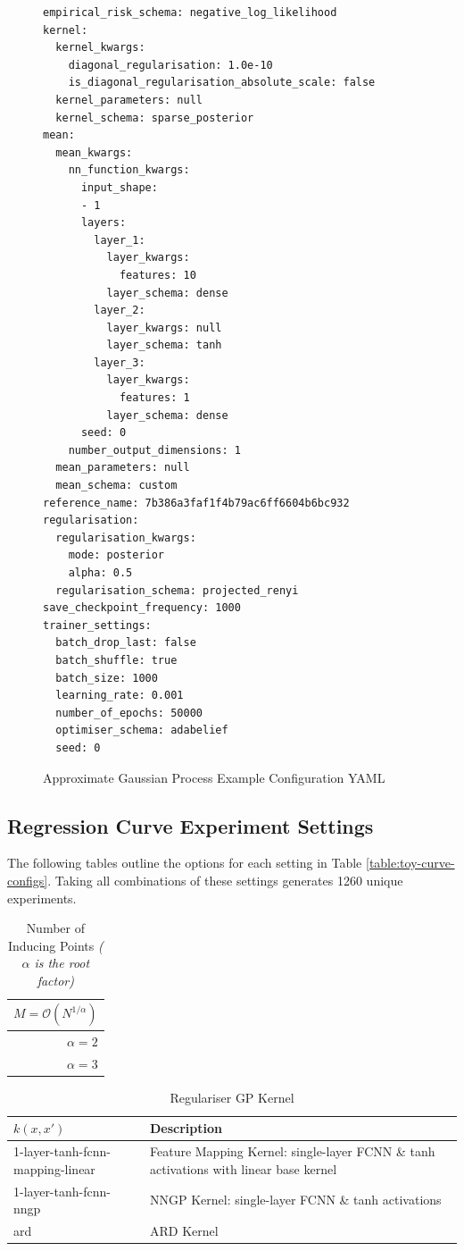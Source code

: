 \documentclass{article}
\numberwithin{equation}{section}
\begin{document}
\newpage
\begin{figure}[!h]
\begin{lstlisting}[style=yaml]
empirical_risk_schema: negative_log_likelihood
kernel:
  kernel_kwargs:
    diagonal_regularisation: 1.0e-10
    is_diagonal_regularisation_absolute_scale: false
  kernel_parameters: null
  kernel_schema: sparse_posterior
mean:
  mean_kwargs:
    nn_function_kwargs:
      input_shape:
      - 1
      layers:
        layer_1:
          layer_kwargs:
            features: 10
          layer_schema: dense
        layer_2:
          layer_kwargs: null
          layer_schema: tanh
        layer_3:
          layer_kwargs:
            features: 1
          layer_schema: dense
      seed: 0
    number_output_dimensions: 1
  mean_parameters: null
  mean_schema: custom
reference_name: 7b386a3faf1f4b79ac6ff6604b6bc932
regularisation:
  regularisation_kwargs:
    mode: posterior
    alpha: 0.5
  regularisation_schema: projected_renyi
save_checkpoint_frequency: 1000
trainer_settings:
  batch_drop_last: false
  batch_shuffle: true
  batch_size: 1000
  learning_rate: 0.001
  number_of_epochs: 50000
  optimiser_schema: adabelief
  seed: 0
\end{lstlisting}
\caption{Approximate Gaussian Process Example Configuration YAML}
\end{figure}
\newpage 
\subsection{Regression Curve Experiment Settings}\label{appendix:configurations}
The following tables outline the options for each setting in Table \ref{table:toy-curve-configs}. 
Taking all combinations of these settings generates 1260 unique experiments.

\begin{table}[h!]
\tiny
\centering
\begin{tabular}{r}
\toprule
 $M = \mathcal{O}\left(N^{1/\alpha}\right)$ \\
\midrule
                                 $\alpha=2$ \\
                                 $\alpha=3$ \\
\bottomrule
\end{tabular}
\caption{Number of Inducing Points \textit{($\alpha$ is the root factor)}}
\end{table}

\begin{table}[h!]
\tiny
\centering
\begin{tabular}{ll}
\toprule
             $k(x, x')$ & Description\\
\midrule
1-layer-tanh-fcnn-mapping-linear & Feature Mapping Kernel: single-layer FCNN \& tanh activations with linear base kernel\\
          1-layer-tanh-fcnn-nngp &  NNGP Kernel: single-layer FCNN \& tanh activations\\
                            ard & ARD Kernel\\
\bottomrule
\end{tabular}
\caption{Regulariser GP Kernel}
\end{table}
\end{document}
